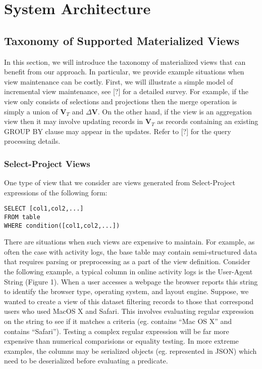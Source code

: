 \section{System Architecture}
\subsection{Taxonomy of Supported Materialized Views}

In this section, we will introduce the taxonomy of materialized views
that can benefit from our approach. In particular, we provide example
situations when view maintenance can be costly. First, we will illustrate
a simple model of incremental view maintenance, see {[}?{]} for a
detailed survey.  For example, if
the view only consists of selections and projections then the merge
operation is simply a union of $\textbf{V}_{T}$ and $\Delta\textbf{V}$.
On the other hand, if the view is an aggregation view then it may
involve updating records in $\textbf{V}_{T}$ as records containing
an existing GROUP BY clause may appear in the updates. Refer to {[}?{]}
for the query processing details.


\subsubsection{Select-Project Views}

One type of view that we consider are views generated from Select-Project
expressions of the following form:

\begin{lstlisting}
SELECT [col1,col2,...] 
FROM table 
WHERE condition([col1,col2,...]) 
\end{lstlisting}
There are situations when such views are expensive to maintain. For
example, as often the case with activity logs, the base table may
contain semi-structured data that requires parsing or preprocessing
as a part of the view definition. Consider the following example,
a typical column in online activity logs is the User-Agent String
(Figure 1). When a user accesses a webpage the browser reports this
string to identify the browser type, operating system, and layout
engine. Suppose, we wanted to create a view of this dataset filtering
records to those that correspond users who used MacOS X and Safari.
This involves evaluating regular expression on the string to see if
it matches a criteria (eg. contains ``Mac OS X'' and contains ``Safari'').
Testing a complex regular expression will be far more expensive than
numerical comparisions or equality testing. In more extreme examples,
the columns may be serialized objects (eg. represented in JSON) which
need to be deserialized before evaluating a predicate.

